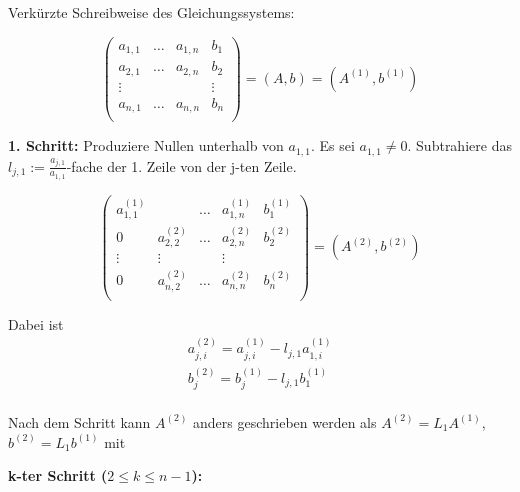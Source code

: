 \documentclass[a4paper,10pt]{scrartcl}
\newtheorem[L]{satz}{Satz}[section]
\newtheorem[S]{beweis}{Beweis}
\newtheorem[S]{beh}{Behauptung}
\begin{document}
Verkürzte Schreibweise des Gleichungssystems:

\[
  \begin{pmatrix}
    a_{1,1} & \dots & a_{1,n} & b_1 \\
    a_{2,1} & \dots & a_{2,n} & b_2 \\
    \vdots & & & \vdots \\
    a_{n,1} & \dots & a_{n,n} & b_n \\
  \end{pmatrix}
  = (A, b) = (A^{(1)}, b^{(1)})
\]

\textbf{1. Schritt:} Produziere Nullen unterhalb von $a_{1,1}$. Es sei $a_{1,1} \neq 0$.
  Subtrahiere das $l_{j,1} := \frac{a_{j,1}}{a_{1,1}}$-fache der 1. Zeile von der j-ten Zeile.

\[
  \begin{pmatrix}
    a_{1,1}^{(1)} & & \dots & a_{1,n}^{(1)} & b_1^{(1)} \\
    0 & a_{2,2}^{(2)} & \dots & a_{2,n}^{(2)} & b_2^{(2)} \\
    \vdots & \vdots & & \vdots \\
    0 & a_{n,2}^{(2)} & \dots & a_{n,n}^{(2)} & b_n^{(2)} \\
  \end{pmatrix}
  = (A^{(2)}, b^{(2)})
\]

Dabei ist
\begin{align*}
  a_{j, i}^{(2)} = a_{j, i}^{(1)} - l_{j, 1} a_{1, i}^{(1)} \\
  b_{j}^{(2)} = b_{j}^{(1)} - l_{j, 1} b_{1}^{(1)} \\
\end{align*}

Nach dem Schritt kann $A^{(2)}$ anders geschrieben werden als $A^{(2)} = L_1 A^{(1)}$, $b^{(2)}=L_1 b^{(1)}$ mit

\begin{comment}
\[
  L_1 = \begin{pmatrix}
    1 & & & & 0 \\
    -l_{2,1} & 1 \\
    -l_{3,1} & 0 & 1 \\
     \vdots & \vdots & & \ddots \\
     -l_{n,1} & 0 & 0 & \dots & 1 \\
  \end{pmatrix}
\]
\end{comment}

\textbf{k-ter Schritt ($2 \leq k \leq n-1$):}
\end{document}
